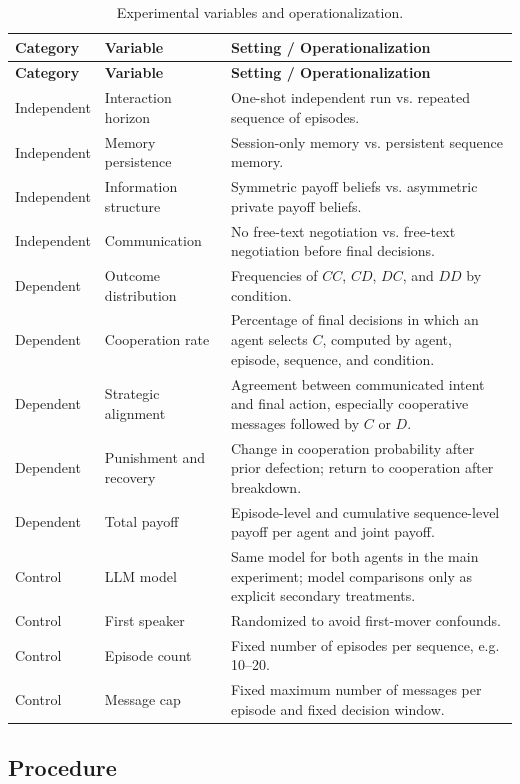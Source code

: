 \documentclass[12pt,a4paper]{article}
\begin{document}
\begin{longtable}{p{} p{} p{}}
\caption{Experimental variables and operationalization.}
\label{tab:variables}\\
\toprule
\textbf{Category} & \textbf{Variable} & \textbf{Setting / Operationalization} \\
\midrule
\endfirsthead
\toprule
\textbf{Category} & \textbf{Variable} & \textbf{Setting / Operationalization} \\
\midrule
\endhead
Independent & Interaction horizon & One-shot independent run vs. repeated sequence of episodes. \\
Independent & Memory persistence & Session-only memory vs. persistent sequence memory. \\
Independent & Information structure & Symmetric payoff beliefs vs. asymmetric private payoff beliefs. \\
Independent & Communication & No free-text negotiation vs. free-text negotiation before final decisions. \\
Dependent & Outcome distribution & Frequencies of $CC$, $CD$, $DC$, and $DD$ by condition. \\
Dependent & Cooperation rate & Percentage of final decisions in which an agent selects $C$, computed by agent, episode, sequence, and condition. \\
Dependent & Strategic alignment & Agreement between communicated intent and final action, especially cooperative messages followed by $C$ or $D$. \\
Dependent & Punishment and recovery & Change in cooperation probability after prior defection; return to cooperation after breakdown. \\
Dependent & Total payoff & Episode-level and cumulative sequence-level payoff per agent and joint payoff. \\
Control & LLM model & Same model for both agents in the main experiment; model comparisons only as explicit secondary treatments. \\
Control & First speaker & Randomized to avoid first-mover confounds. \\
Control & Episode count & Fixed number of episodes per sequence, e.g. 10--20. \\
Control & Message cap & Fixed maximum number of messages per episode and fixed decision window. \\
\bottomrule
\end{longtable}

\subsection{Procedure}
\end{document}
